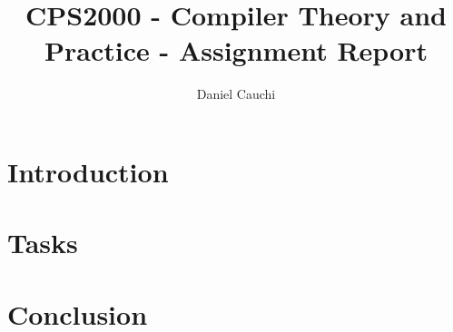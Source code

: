 \documentclass{report}
\begin{document}
\title{CPS2000  - Compiler Theory and Practice - Assignment Report}
\author{Daniel Cauchi}
\date{}
\maketitle

\tableofcontents

\chapter{Introduction}

\chapter{Tasks}

\pagebreak

\pagebreak

\pagebreak

\chapter{Conclusion}


\pagebreak



\end{document}
